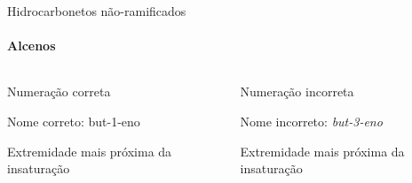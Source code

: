 \documentclass[presentation,professionalfonts,smaller,aspectratio=169]{beamer}
\begin{document}
\begin{frame}[label={sec:org32356b7}]{Hidrocarbonetos não-ramificados}
\framesubtitle{Alcenos}
\begin{columns}
\begin{column}{0.45\columnwidth}
\begin{block}{Numeração correta}
\vspace{.5cm}



\vspace{.5cm}

Nome correto: \alert{but-1-eno} 

\vspace{.5cm}

Extremidade mais próxima da insaturação
\end{block}
\end{column}

\begin{column}{0.45\columnwidth}
\begin{block}{Numeração incorreta}
\vspace{.5cm}


\vspace{.5cm}

Nome incorreto: \emph{but-3-eno}

\vspace{.5cm}

Extremidade mais próxima da insaturação
\end{block}
\end{column}
\end{columns}
\end{frame}
\end{document}
